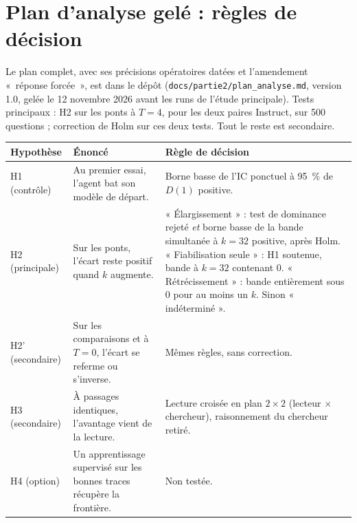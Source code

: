 \section{Plan d'analyse gelé : règles de décision}\label{ann:plan}
Le plan complet, avec ses précisions opératoires datées et l'amendement «~réponse forcée~», est dans le dépôt (\texttt{docs/partie2/plan\_analyse.md}, version 1.0, gelée le 12 novembre 2026 avant les runs de l'étude principale). Tests principaux : H2 sur les ponts à $T = 4$, pour les deux paires Instruct, sur 500 questions ; correction de Holm sur ces deux tests. Tout le reste est secondaire.

\begin{center}\small
\begin{tabular}{>{\raggedright\arraybackslash}p{2.4cm}>{\raggedright\arraybackslash}p{4.4cm}>{\raggedright\arraybackslash}p{7.2cm}}
\toprule
Hypothèse & Énoncé & Règle de décision \\
\midrule
H1 (contrôle) & Au premier essai, l'agent bat son modèle de départ. & Borne basse de l'IC ponctuel à 95~\% de $D(1)$ positive. \\
H2 (principale) & Sur les ponts, l'écart reste positif quand $k$ augmente. & « Élargissement » : test de dominance rejeté \emph{et} borne basse de la bande simultanée à $k = 32$ positive, après Holm. « Fiabilisation seule » : H1 soutenue, bande à $k = 32$ contenant 0. « Rétrécissement » : bande entièrement sous 0 pour au moins un $k$. Sinon « indéterminé ». \\
H2' (secondaire) & Sur les comparaisons et à $T = 0$, l'écart se referme ou s'inverse. & Mêmes règles, sans correction. \\
H3 (secondaire) & À passages identiques, l'avantage vient de la lecture. & Lecture croisée en plan $2 \times 2$ (lecteur $\times$ chercheur), raisonnement du chercheur retiré. \\
H4 (option) & Un apprentissage supervisé sur les bonnes traces récupère la frontière. & Non testée. \\
\bottomrule
\end{tabular}
\end{center}

